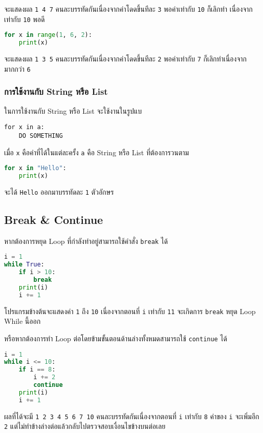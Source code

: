 จะแสดงผล \verb|1 4 7| คนละบรรทัดกันเนื่องจากค่าโดดขึ้นทีละ \verb|3| พอค่าเท่ากับ \verb|10| ก็เลิกทำ เนื่องจากเท่ากับ \verb|10| พอดี

\begin{lstlisting}[language=Python]
for x in range(1, 6, 2):
    print(x)
\end{lstlisting}

จะแสดงผล \verb|1 3 5| คนละบรรทัดกันเนื่องจากค่าโดดขึ้นทีละ \verb|2| พอค่าเท่ากับ \verb|7| ก็เลิกทำเนื่องจากมากกว่า \verb|6|

\subsubsection{การใช้งานกับ String หรือ List}

ในการใช้งานกับ String หรือ List จะใช้งานในรูปแบ

\begin{verbatim}
for x in a:
    DO SOMETHING
\end{verbatim}

เมื่อ \verb|x| คือค่าที่ได้ในแต่ละครั้ง \verb|a| คือ String หรือ List ที่ต้องการวนตาม

\begin{lstlisting}[language=Python]
for x in "Hello":
    print(x)
\end{lstlisting}

จะได้ \verb|Hello| ออกมาบรรทัดละ \verb|1| ตัวอักษร

\subsection{Break \& Continue}

หากต้องการหยุด Loop ที่กำลังทำอยู่สามารถใช้คำสั่ง \verb|break| ได้

\begin{lstlisting}[language=Python]
i = 1
while True:
    if i > 10:
        break
    print(i)
    i += 1
\end{lstlisting}

โปรแกรมข้างต้นจะแสดงค่า \verb|1| ถึง \verb|10| เนื่องจากตอนที่ \verb|i| เท่ากับ \verb|11| จะเกิดการ \verb|break| หยุด Loop While นี้ออก

หรือหากต้องการทำ Loop ต่อโดยข้ามขั้นตอนด้านล่างทั้งหมดสามารถใช้ \verb|continue| ได้
\begin{lstlisting}[language=Python]
i = 1
while i <= 10:
    if i == 8:
        i += 2
        continue
    print(i)
    i += 1
\end{lstlisting}

ผลที่ได้จะมี \verb|1 2 3 4 5 6 7 10| คนละบรรทัดกันเนื่องจากตอนที่ \verb|i| เท่ากับ \verb|8| ค่าของ \verb|i| จะเพิ่มอีก \verb|2| แต่ไม่ทำข้างล่างต่อแล้วกลับไปตรวจสอบเงื่อนไขข้างบนต่อเลย